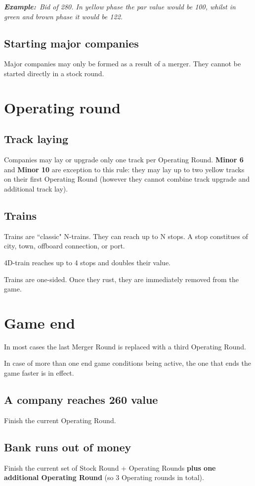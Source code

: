 \documentclass[10pt,a4paper,twocolumn]{article}
\newcommand{\Example}{\textbf{Example:}}
\begin{document}
\textit{\Example~Bid of 280. In yellow phase the par value would be 100, whilst in green and brown phase it would be 122.}

\subsection{Starting major companies}
Major companies may only be formed as a result of a merger. They cannot be started directly in a stock round.


\section{Operating round}

\subsection{Track laying}
Companies may lay or upgrade only one track per Operating Round. \textbf{Minor 6} and \textbf{Minor 10} are exception to this rule: they may lay up to two yellow tracks on their first Operating Round (however they cannot combine track upgrade and additional track lay).


\subsection{Trains}
Trains are ``classic" N-trains. They can reach up to N stops. A stop constitues of city, town, offboard connection, or port.

4D-train reaches up to 4 stops and doubles their value.

Trains are one-sided. Once they rust, they are immediately removed from the game.


\section{Game end}

In most cases the last Merger Round is replaced with a third Operating Round.

In case of more than one end game conditions being active, the one that ends the game faster is in effect.

\subsection{A company reaches 260 value}
Finish the current Operating Round.

\subsection{Bank runs out of money}
Finish the current set of Stock Round + Operating Rounds \textbf{plus one additional Operating Round} (so 3 Operating rounds in total).
\end{document}
